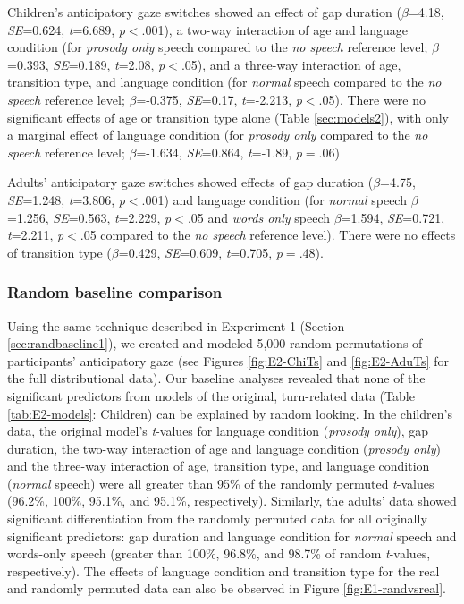 \documentclass[authoryear, 12pt]{elsarticle}
\begin{document}
Children's anticipatory gaze switches showed an effect of gap duration (\textit{$\beta$}=4.18, \textit{SE}=0.624, \textit{t}=6.689, \textit{p}$<$.001), a two-way interaction of age and language condition (for \textit{prosody only} speech compared to the \textit{no speech} reference level; \textit{$\beta$}=0.393, \textit{SE}=0.189, \textit{t}=2.08, \textit{p}$<$.05), and a three-way interaction of age, transition type, and language condition (for \textit{normal} speech compared to the \textit{no speech} reference level; \textit{$\beta$}=-0.375, \textit{SE}=0.17, \textit{t}=-2.213, \textit{p}$<$.05). There were no significant effects of age or transition type alone (Table \ref{sec:models2}), with only a marginal effect of language condition (for \textit{prosody only} compared to the \textit{no speech} reference level; \textit{$\beta$}=-1.634, \textit{SE}=0.864, \textit{t}=-1.89, \textit{p}$=$.06)

Adults' anticipatory gaze switches showed effects of gap duration (\textit{$\beta$}=4.75, \textit{SE}=1.248, \textit{t}=3.806, \textit{p}$<$.001) and language condition (for \textit{normal} speech \textit{$\beta$}=1.256, \textit{SE}=0.563, \textit{t}=2.229, \textit{p}$<$.05 and \textit{words only} speech \textit{$\beta$}=1.594, \textit{SE}=0.721, \textit{t}=2.211, \textit{p}$<$.05  compared to the \textit{no speech} reference level). There were no effects of transition type (\textit{$\beta$}=0.429, \textit{SE}=0.609, \textit{t}=0.705, \textit{p}$=$.48).

\subsubsection{Random baseline comparison}
\label{sec:randbaseline2}

Using the same technique described in Experiment 1 (Section \ref{sec:randbaseline1}), we created and modeled 5,000 random permutations of participants' anticipatory gaze (see Figures \ref{fig:E2-ChiTs} and \ref{fig:E2-AduTs} for the full distributional data). Our baseline analyses revealed that none of the significant predictors from models of the original, turn-related data (Table \ref{tab:E2-models}: Children) can be explained by random looking. In the children's data, the original model's \textit{t}-values for language condition (\textit{prosody only}), gap duration, the two-way interaction of age and language condition (\textit{prosody only}) and the three-way interaction of age, transition type, and language condition (\textit{normal} speech) were all greater than 95\% of the randomly permuted \textit{t}-values (96.2\%, 100\%, 95.1\%, and 95.1\%, respectively). Similarly, the adults' data showed significant differentiation from the randomly permuted data for all originally significant predictors: gap duration and language condition for \textit{normal} speech and words-only speech (greater than 100\%, 96.8\%, and 98.7\% of random \textit{t}-values, respectively). The effects of language condition and transition type for the real and randomly permuted data can also be observed in Figure \ref{fig:E1-randvsreal}.
\end{document}
